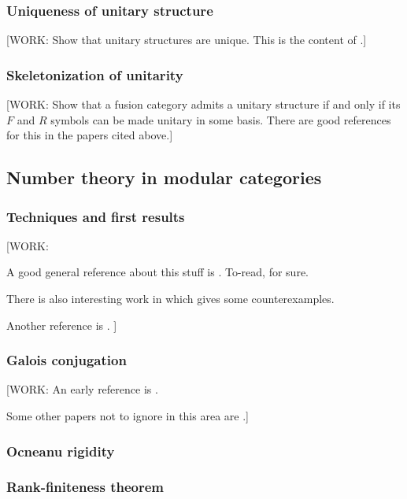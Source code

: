 \subsubsection{Uniqueness of unitary structure}

[WORK: Show that unitary structures are unique. This is the content of \cite{reutter2023uniqueness}.]

\subsubsection{Skeletonization of unitarity}

[WORK: Show that a fusion category admits a unitary structure if and only if its $F$ and $R$ symbols can be made unitary in some basis. There are good references for this in the papers cited above.]



\subsection{Number theory in modular categories}

\subsubsection{Techniques and first results}

[WORK:

A good general reference about this stuff is \cite{gannon2019algebraic}. To-read, for sure.

There is also interesting work in \cite{morrison2012non} which gives some counterexamples.

Another reference is \cite{davidovich2013arithmetic}.
]

\subsubsection{Galois conjugation}

[WORK: An early reference is \cite{coste1993remarks}.

Some other papers not to ignore in this area are \cite{plavnik2023modular, buican2022galois}.]

\subsubsection{Ocneanu rigidity}

\subsubsection{Rank-finiteness theorem}


